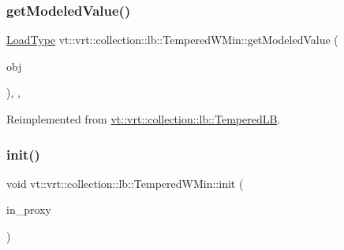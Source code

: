 \subsubsection{\texorpdfstring{get\+Modeled\+Value()}{getModeledValue()}}
{\footnotesize\ttfamily \hyperlink{namespacevt_a8fb51741340b87d7aaee0bef60e9896b}{Load\+Type} vt\+::vrt\+::collection\+::lb\+::\+Tempered\+W\+Min\+::get\+Modeled\+Value (\begin{DoxyParamCaption}\item[{const \hyperlink{structvt_1_1elm_1_1_element_i_d_struct}{elm\+::\+Element\+I\+D\+Struct} \&}]{obj }\end{DoxyParamCaption})\hspace{0.3cm}{\ttfamily [override]}, {\ttfamily [protected]}, {\ttfamily [virtual]}}



Reimplemented from \hyperlink{structvt_1_1vrt_1_1collection_1_1lb_1_1_tempered_l_b_a2a6dd8bb28b45be1dc6a35d9f8bb0b68}{vt\+::vrt\+::collection\+::lb\+::\+Tempered\+LB}.

\mbox{\label{structvt_1_1vrt_1_1collection_1_1lb_1_1_tempered_w_min_a4568be2f1baa683968308e48a0743dea}} 
\subsubsection{\texorpdfstring{init()}{init()}}
{\footnotesize\ttfamily void vt\+::vrt\+::collection\+::lb\+::\+Tempered\+W\+Min\+::init (\begin{DoxyParamCaption}\item[{\hyperlink{structvt_1_1objgroup_1_1proxy_1_1_proxy}{objgroup\+::proxy\+::\+Proxy}$<$ \hyperlink{structvt_1_1vrt_1_1collection_1_1lb_1_1_tempered_w_min}{Tempered\+W\+Min} $>$}]{in\+\_\+proxy }\end{DoxyParamCaption})}

\mbox{\label{structvt_1_1vrt_1_1collection_1_1lb_1_1_tempered_w_min_a0dd469ab6f3f8aebebf55c773df099ce}} 
